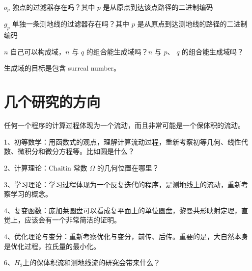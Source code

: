 \documentclass[a4paper,12pt]{article}
\begin{document}
$o_p$ 独点的过滤器存在吗？其中 $p$ 是从原点到达该点路径的二进制编码

$g_p$ 单独一条测地线的过滤器存在吗？其中 $p$ 是从原点到达测地线的路径的二进制编码

$n$ 自己可以构成域，$n$ 与 $q$ 的组合能生成域吗？$n$ 与 $p$、 $q$ 的组合能生成域吗？

生成域的目标是包含 surreal number。

\newpage

\section{几个研究的方向}

任何一个程序的计算过程体现为一个流动，而且非常可能是一个保体积的流动。

1、初等数学：用函数式的观点，理解计算流动过程，重新考察初等几何、线性代数、微积分和微分方程等。比如圆是什么？

2、计算理论：Chaitin 常数 $\Omega$ 的几何位置在哪里？

3、学习理论：学习过程体现为一个反复迭代的程序，是测地线上的流动，重新考察学习的概念。

4、复变函数：庞加莱圆盘可以看成复平面上的单位圆盘，黎曼共形映射定理，直觉上，应该会有一个非常简洁的证明。

4、优化理论与变分：重新考察优化与变分，前传、后传。重要的是，大自然本身是优化过程，拉氏量的最小化。

6、$H_2$上的保体积流和测地线流的研究会带来什么？
\end{document}
